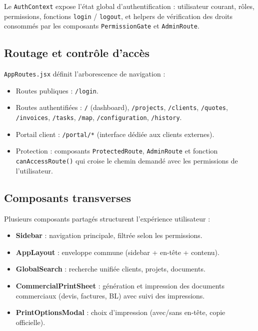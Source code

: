 Le \texttt{AuthContext} expose l'état global d'authentification : utilisateur courant,
rôles, permissions, fonctions \texttt{login} / \texttt{logout}, et helpers de
vérification des droits consommés par les composants \texttt{PermissionGate} et
\texttt{AdminRoute}.

\subsection{Routage et contrôle d'accès}

\texttt{AppRoutes.jsx} définit l'arborescence de navigation :

\begin{itemize}
  \item Routes publiques : \texttt{/login}.
  \item Routes authentifiées : \texttt{/} (dashboard), \texttt{/projects},
  \texttt{/clients}, \texttt{/quotes}, \texttt{/invoices}, \texttt{/tasks},
  \texttt{/map}, \texttt{/configuration}, \texttt{/history}.
  \item Portail client : \texttt{/portal/*} (interface dédiée aux clients externes).
  \item Protection : composants \texttt{ProtectedRoute}, \texttt{AdminRoute} et
  fonction \texttt{canAccessRoute()} qui croise le chemin demandé avec les
  permissions de l'utilisateur.
\end{itemize}

\subsection{Composants transverses}

Plusieurs composants partagés structurent l'expérience utilisateur :

\begin{itemize}
  \item \textbf{Sidebar} : navigation principale, filtrée selon les permissions.
  \item \textbf{AppLayout} : enveloppe commune (sidebar + en-tête + contenu).
  \item \textbf{GlobalSearch} : recherche unifiée clients, projets, documents.
  \item \textbf{CommercialPrintSheet} : génération et impression des documents
  commerciaux (devis, factures, BL) avec suivi des impressions.
  \item \textbf{PrintOptionsModal} : choix d'impression (avec/sans en-tête,
  copie officielle).
\end{itemize}

